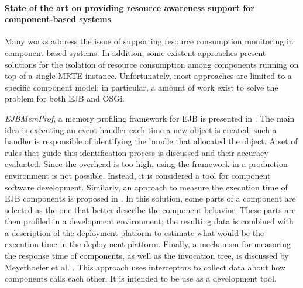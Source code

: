 \paragraph{State of the art on providing resource awareness support for component-based systems}

Many works address the issue of supporting resource consumption monitoring in component-based systems.
In addition, some existent approaches present solutions for the isolation of resource consumption among components running on top of a single MRTE instance.
Unfortunately, most approaches are limited to a specific component model; in particular, a amount of work exist to solve the problem for both EJB and OSGi.

\textit{EJBMemProf}, a memory profiling framework for EJB is presented in \cite{Meyerhoefer2005}.
The main idea is executing an event handler each time a new object is created; such a handler is responsible of identifying the bundle that allocated the object.
A set of rules that guide this identification process is discussed and their accuracy evaluated.
Since the overhead is too high, using the framework in a production environment is not possible.
Instead, it is considered a tool for component software development.
Similarly, an approach to measure the execution time of EJB components is proposed in \cite{Meyerhofer05towardsplatform-independent}.
In this solution, some parts of a component are selected as the one that better describe the component behavior.
These parts are then profiled in a development environment; the resulting data is combined with a description of the deployment platform to estimate what would be the execution time in the deployment platform.
Finally, a mechanism for measuring the response time of components, as well as the invocation tree, is discussed by Meyerhoefer et al. \cite{Meyerhoefer2007}.
This approach uses interceptors to collect data about how components calls each other.
It is intended to be use as a development tool.

